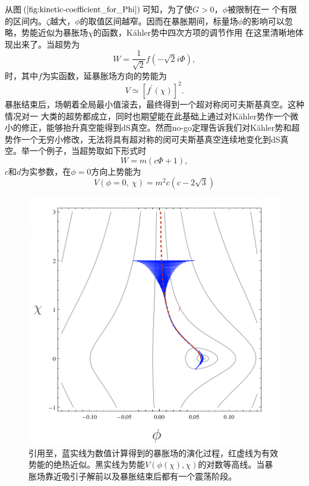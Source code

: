 从图$(\ref{fig:kinetic-coefficient_for_Phi})$可知，为了使$G>0$，$\phi$被限制在一
个有限的区间内。$\zeta$越大，$\phi$的取值区间越窄。因而在暴胀期间，标量场$\phi$的影响可以忽略，势能近似为暴胀场$\chi$的函数，K\"ahler势中四次方项的调节作用
在这里清晰地体现出来了。当超势为
\begin{equation}
  W = \frac{1}{\sqrt{2}} f(-\sqrt{2}i\Phi),
\end{equation}
时，其中$f$为实函数，延暴胀场方向的势能为
\begin{equation}
  V\simeq {\left[f^\prime(\chi)\right]}^2.
\end{equation}
暴胀结束后，场朝着全局最小值滚去，最终得到一个超对称闵可夫斯基真空。这种情况对一
大类的超势都成立，同时也期望能在此基础上通过对K\"ahler势作一个微小的修正，能够抬升真空能得到dS真空。然而no-go定理\citep{kallosh2014analytic}告诉我们对K\"ahler势和超势作一个无穷小修改，无法将具有超对称的闵可夫斯基真空连续地变化到dS真空。举一个例子，当超势取如下形式时
\begin{equation}
  W=m(c\Phi+1),  
\end{equation}
$c$和$d$为实参数，在$\phi=0$方向上势能为
\begin{equation}
  V(\phi=0,\ \chi)=m^2c(c-2\sqrt{3}) 
\end{equation}
\begin{figure}
  \centering
  \includegraphics[width=5in]{Img/potential-for-linear-superpotential.png}
  \caption{引用至\citep{linde2015inflation}，蓝实线为数值计算得到的暴胀场的演化过程，红虚线为有效势能的绝热近似。黑实线为势能$V(\phi(\chi),
  \chi)$的对数等高线。当暴胀场靠近吸引子解前以及暴胀结束后都有一个震荡阶段。}\label{fig:potential-for-linear-superpotential}
\end{figure}
